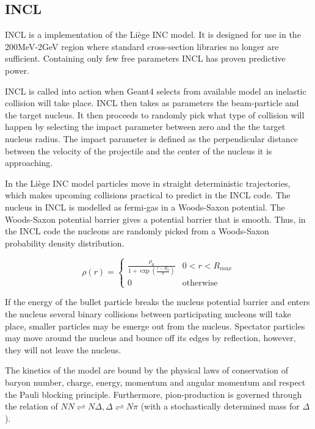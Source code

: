 \subsection{INCL}

INCL is a implementation of the Liège INC model. It is designed for use in the 200MeV-2GeV region where standard cross-section libraries no longer are sufficient. Containing only few free parameters INCL has proven predictive power.

INCL is called into action when Geant4 selects from available model an inelastic collision will take place. INCL then takes as parameters the beam-particle and the target nucleus. It then proceeds to randomly pick what type of collision will happen by selecting the impact parameter between zero and the the target nucleus radius. The impact parameter is defined as the perpendicular distance between the velocity of the projectile and the center of the nucleus it is approaching.

In the Liège INC model particles move in straight deterministic trajectories, which makes upcoming collisions practical to predict in the INCL code.
 The nucleus in INCL is modelled as fermi-gas in a Woods-Saxon potential. %
 The Woods-Saxon potential barrier gives a potential barrier that is smooth. Thus, in the INCL code the nucleons are randomly picked from a Woods-Saxon probability density distribution.

\begin{equation}
\rho(r) = \begin{cases}
\frac{\rho_{0}}{1+\exp({\frac{r-R_{0}}{a}})} & 0 < r < R_{max} \\
0 & \text{otherwise}
\end{cases}
\label{WoodsSaxon2}
\end{equation}

If the energy of the bullet particle breaks the nucleus potential barrier and enters the nucleus several binary collisions between participating nucleons will take place, smaller particles may be emerge out from the nucleus. Spectator particles may move around the nucleus and bounce off its edges by reflection, however, they will not leave the nucleus.

The kinetics of the model are bound by the physical laws of conservation of baryon number, charge, energy, momentum and angular momentum and respect the Pauli blocking principle. Furthermore, pion-production is governed through the relation of $NN \rightleftharpoons N \Delta, \Delta \rightleftharpoons N\pi$ (with a stochastically determined mass for $\Delta$).


